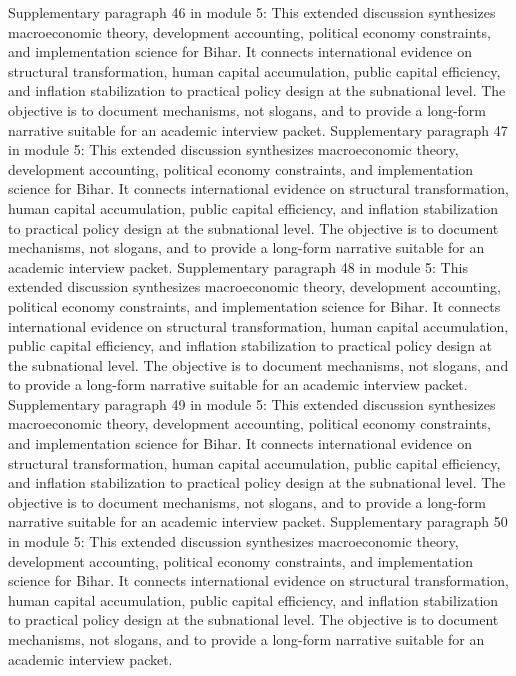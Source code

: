 \documentclass[preprint,12pt]{elsarticle}
\begin{document}
Supplementary paragraph 46 in module 5: This extended discussion synthesizes macroeconomic theory, development accounting, political economy constraints, and implementation science for Bihar. It connects international evidence on structural transformation, human capital accumulation, public capital efficiency, and inflation stabilization to practical policy design at the subnational level. The objective is to document mechanisms, not slogans, and to provide a long-form narrative suitable for an academic interview packet.
Supplementary paragraph 47 in module 5: This extended discussion synthesizes macroeconomic theory, development accounting, political economy constraints, and implementation science for Bihar. It connects international evidence on structural transformation, human capital accumulation, public capital efficiency, and inflation stabilization to practical policy design at the subnational level. The objective is to document mechanisms, not slogans, and to provide a long-form narrative suitable for an academic interview packet.
Supplementary paragraph 48 in module 5: This extended discussion synthesizes macroeconomic theory, development accounting, political economy constraints, and implementation science for Bihar. It connects international evidence on structural transformation, human capital accumulation, public capital efficiency, and inflation stabilization to practical policy design at the subnational level. The objective is to document mechanisms, not slogans, and to provide a long-form narrative suitable for an academic interview packet.
Supplementary paragraph 49 in module 5: This extended discussion synthesizes macroeconomic theory, development accounting, political economy constraints, and implementation science for Bihar. It connects international evidence on structural transformation, human capital accumulation, public capital efficiency, and inflation stabilization to practical policy design at the subnational level. The objective is to document mechanisms, not slogans, and to provide a long-form narrative suitable for an academic interview packet.
Supplementary paragraph 50 in module 5: This extended discussion synthesizes macroeconomic theory, development accounting, political economy constraints, and implementation science for Bihar. It connects international evidence on structural transformation, human capital accumulation, public capital efficiency, and inflation stabilization to practical policy design at the subnational level. The objective is to document mechanisms, not slogans, and to provide a long-form narrative suitable for an academic interview packet.
\end{document}
